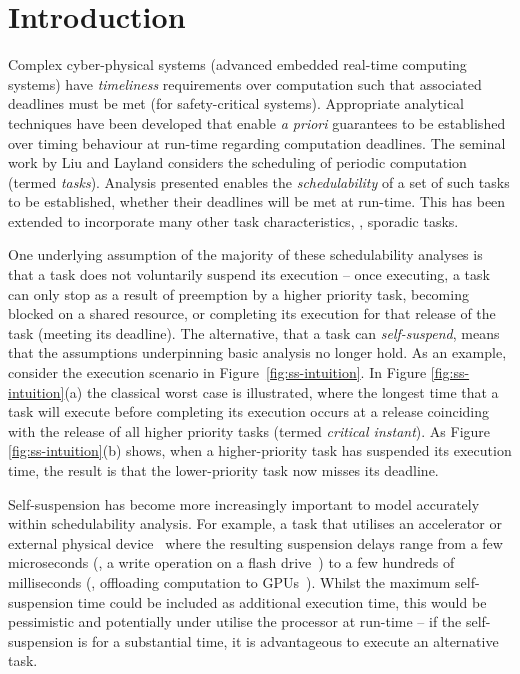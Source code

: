 \section{Introduction}

Complex cyber-physical systems (\ie advanced embedded real-time computing systems) have \emph{timeliness} requirements over computation such that associated deadlines must be met (\eg for safety-critical systems). Appropriate analytical techniques have been developed that enable \emph{a priori} guarantees to be established over timing behaviour at run-time regarding computation deadlines.  
The seminal work by Liu and Layland \cite{Liu_1973} considers the scheduling of periodic computation (termed \emph{tasks}). 
Analysis presented enables the \emph{schedulability} of a set of such tasks to be established, \ie whether their deadlines will be met at run-time. This has been extended to incorporate many other task characteristics, \eg, sporadic tasks\cite{Mok:1983:FDP:888951}. 

One underlying assumption of the majority of these schedulability analyses is that a task does not voluntarily suspend its execution -- once executing, a task can only stop as a result of preemption by a higher priority task, becoming blocked on a shared resource, or completing its execution for that release of the task (\ie meeting its deadline). The alternative, that a task can \emph{self-suspend}, means that the assumptions underpinning basic analysis no longer hold. As an example, consider the execution scenario in Figure~\ref{fig:ss-intuition}. In Figure \ref{fig:ss-intuition}(a) the classical worst case is illustrated, where the longest time that a task will execute before completing its execution occurs at a release coinciding with the release of all higher priority tasks (termed \emph{critical instant}). As Figure \ref{fig:ss-intuition}(b) shows, when a higher-priority task  has suspended its execution time, the result is that the lower-priority task now misses its deadline.


Self-suspension has become more increasingly important to model accurately within schedulability analysis. For example, a task that utilises an accelerator or external physical device~\cite{Kang:rtss07,Kato_2011} where the resulting suspension delays range from a few microseconds (\eg, a write operation on a flash drive~\cite{Kang:rtss07}) to a few hundreds of milliseconds (\eg, offloading computation to GPUs~\cite{Kato_2011,Liu_2014}).  Whilst the maximum self-suspension time could be included as additional execution time, this would be pessimistic and potentially under utilise the processor at run-time -- if the self-suspension is for a substantial time, it is advantageous to execute an alternative task.

